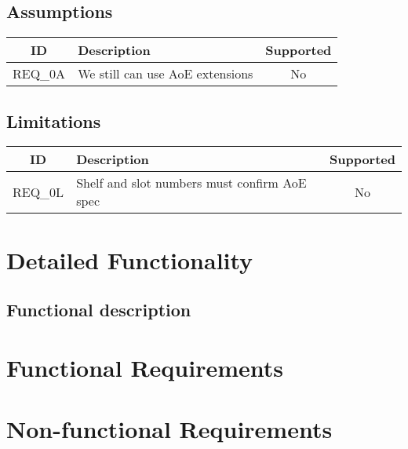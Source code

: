 \documentclass[a4paper,12pt]{article}
\begin{document}
\subsection{Assumptions}
\begin{tabular}{|c|l|c|}
\hline
ID & Description & Supported \\ \hline
REQ\_0A & We still can use AoE extensions  & No\\
\hline
\end{tabular}


\subsection{Limitations}
\begin{tabular}{|c|l|c|}
\hline
ID & Description & Supported \\ \hline
REQ\_0L & Shelf and slot numbers must confirm AoE spec & No\\
\hline
\end{tabular}


\section{Detailed Functionality}
\subsection{Functional description}
\section{Functional Requirements}
\section{Non-functional Requirements}
\end{document}
